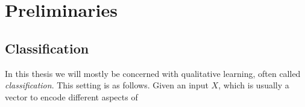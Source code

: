 
\chapter{Preliminaries}
\label{chap:prelim}
\section{Classification} 
\label{sec:class}
In this thesis we will mostly be concerned with qualitative learning, often called \textit{classification}. This setting is as follows. Given an input $X$, which is usually a vector to encode different aspects of
 